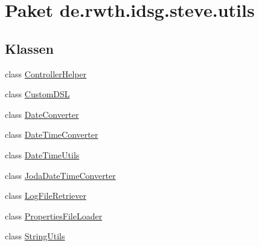 \hypertarget{namespacede_1_1rwth_1_1idsg_1_1steve_1_1utils}{\section{Paket de.\+rwth.\+idsg.\+steve.\+utils}
\label{namespacede_1_1rwth_1_1idsg_1_1steve_1_1utils}
}
\subsection*{Klassen}
\begin{DoxyCompactItemize}
\item 
class \hyperlink{classde_1_1rwth_1_1idsg_1_1steve_1_1utils_1_1_controller_helper}{Controller\+Helper}
\item 
class \hyperlink{classde_1_1rwth_1_1idsg_1_1steve_1_1utils_1_1_custom_d_s_l}{Custom\+D\+S\+L}
\item 
class \hyperlink{classde_1_1rwth_1_1idsg_1_1steve_1_1utils_1_1_date_converter}{Date\+Converter}
\item 
class \hyperlink{classde_1_1rwth_1_1idsg_1_1steve_1_1utils_1_1_date_time_converter}{Date\+Time\+Converter}
\item 
class \hyperlink{classde_1_1rwth_1_1idsg_1_1steve_1_1utils_1_1_date_time_utils}{Date\+Time\+Utils}
\item 
class \hyperlink{classde_1_1rwth_1_1idsg_1_1steve_1_1utils_1_1_joda_date_time_converter}{Joda\+Date\+Time\+Converter}
\item 
class \hyperlink{classde_1_1rwth_1_1idsg_1_1steve_1_1utils_1_1_log_file_retriever}{Log\+File\+Retriever}
\item 
class \hyperlink{classde_1_1rwth_1_1idsg_1_1steve_1_1utils_1_1_properties_file_loader}{Properties\+File\+Loader}
\item 
class \hyperlink{classde_1_1rwth_1_1idsg_1_1steve_1_1utils_1_1_string_utils}{String\+Utils}
\end{DoxyCompactItemize}
